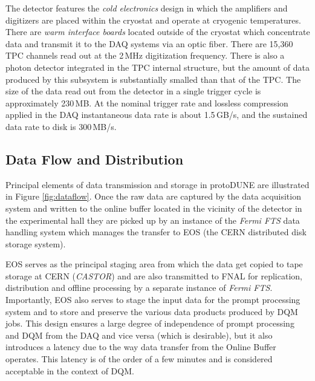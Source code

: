 \documentclass{webofc}
\newcommand{\pd}{protoDUNE\xspace}
\begin{document}
The detector features the \textit{cold electronics} design in which the amplifiers and digitizers
are placed within the cryostat and operate at cryogenic temperatures. There are
\textit{warm interface boards} located outside of the cryostat which concentrate data
and transmit it to the DAQ systems via an optic fiber.
There are 15,360 TPC channels read out at the 2\,MHz digitization frequency. There is also
a photon detector integrated in the TPC internal structure, but the amount of data
produced by this subsystem is substantially smalled than that of the TPC.
The size of the data read out from the detector in a single trigger cycle is approximately 230\,MB. At the nominal
trigger rate and lossless compression applied in the DAQ instantaneous data rate is about
1.5\,GB/s, and the sustained data rate to disk is 300\,MB/s.

\subsection{Data Flow and Distribution}
Principal elements of data transmission and storage in \pd are illustrated in Figure \ref{fig:dataflow}.
Once the raw data are captured by the data acquisition system and written to the online buffer
located in the vicinity of the detector in the experimental hall  they are picked up by an instance of
the \textit{Fermi FTS} data handling system \cite{sam,fts} which manages the transfer to EOS \cite{castoreos}
(the CERN distributed disk storage system).

EOS serves as the principal staging area  \cite{eos_role} from which the data get copied to tape
storage at CERN (\textit{CASTOR})  and are also transmitted to FNAL for replication, distribution and
offline processing by a separate instance of \textit{Fermi FTS}.
Importantly, EOS also serves to stage the input data for the prompt processing system and to
store and preserve  the various data products produced by DQM jobs. This design
ensures a large degree of independence of prompt processing and DQM from the DAQ and vice
versa (which is desirable),
but it also introduces a latency due to the way data transfer from the Online Buffer operates. This latency
is of the order of a few minutes and is considered acceptable in the context of DQM.
\end{document}
